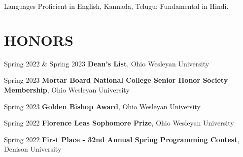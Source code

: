 \documentclass[10pt, letterpaper]{article}
\begin{document}
\begin{skillcategory}{Languages}
  Proficient in English, Kannada, Telugu; Fundamental in Hindi.
\end{skillcategory}

\vspace{\headerSpacing}

\section{HONORS}

\begin{honorentry}
  {Spring 2022 \& Spring 2023} %
  {\textbf{Dean's List}, Ohio Wesleyan University} %
\end{honorentry}

\begin{honorentry}
  {Spring 2023} %
  {\textbf{Mortar Board National College Senior Honor Society Membership}, Ohio Wesleyan University} %
\end{honorentry}

\begin{honorentry}
  {Spring 2023} %
  {\textbf{Golden Bishop Award}, Ohio Wesleyan University} %
\end{honorentry}

\begin{honorentry}
  {Spring 2022} %
  {\textbf{Florence Leas Sophomore Prize}, Ohio Wesleyan University} %
\end{honorentry}

\begin{honorentry}
  {Spring 2022} %
  {\textbf{First Place - 32nd Annual Spring Programming Contest}, Denison University} %
\end{honorentry}
\end{document}

